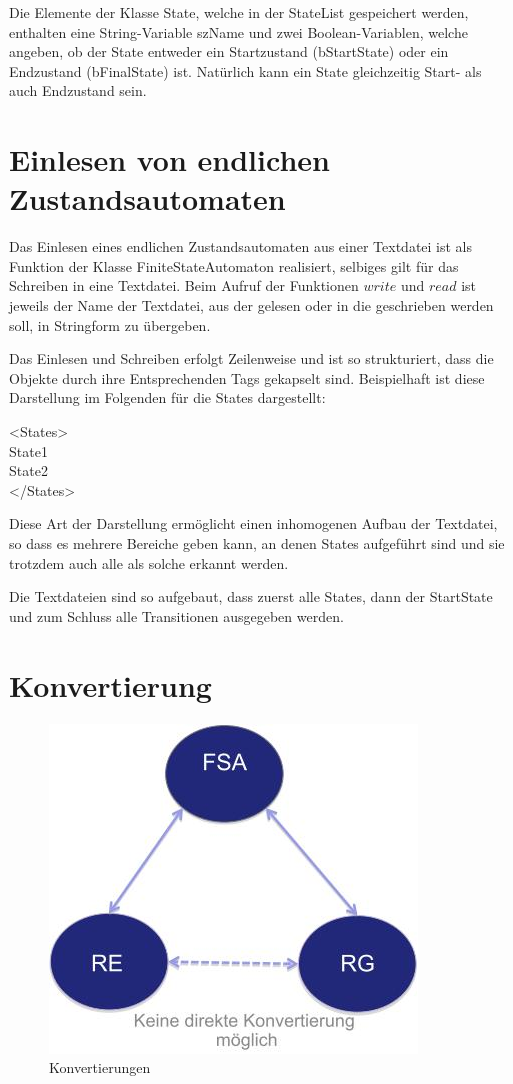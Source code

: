 Die Elemente der Klasse State, welche in der StateList gespeichert werden, enthalten eine String-Variable szName und zwei Boolean-Variablen, welche angeben, ob der State entweder ein Startzustand (bStartState) oder ein Endzustand (bFinalState) ist. Nat\"urlich kann ein State gleichzeitig Start- als auch Endzustand sein.

\section{Einlesen von endlichen Zustandsautomaten}

Das Einlesen eines endlichen Zustandsautomaten aus einer Textdatei ist als Funktion der Klasse FiniteStateAutomaton realisiert, selbiges gilt für das Schreiben in eine Textdatei. Beim Aufruf der Funktionen $write$ und $read$ ist jeweils der Name der Textdatei, aus der gelesen oder in die geschrieben werden soll, in Stringform zu \"ubergeben.

Das Einlesen und Schreiben erfolgt Zeilenweise und ist so strukturiert, dass die Objekte durch ihre Entsprechenden Tags gekapselt sind. Beispielhaft ist diese Darstellung im Folgenden für die States dargestellt:

<States> \\
State1 \\
State2 \\
</States>

Diese Art der Darstellung erm\"oglicht einen inhomogenen Aufbau der Textdatei, so dass es mehrere Bereiche geben kann, an denen States aufgef\"uhrt sind und sie trotzdem auch alle als solche erkannt werden.

Die Textdateien sind so aufgebaut, dass zuerst alle States, dann der StartState und zum Schluss alle Transitionen ausgegeben werden.

\section{Konvertierung}

\begin{figure}[h]
 \centering
 \includegraphics[keepaspectratio, scale=0.89]{objectsToInclude/Konvertierung.jpg}
 \caption{Konvertierungen}
\label{fig:FSA_Konv}
\end{figure}


